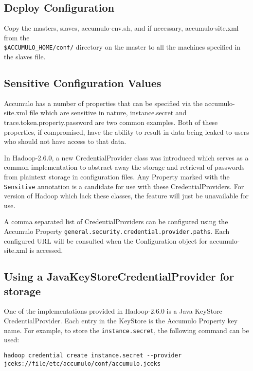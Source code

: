 \subsection{Deploy Configuration}

Copy the masters, slaves, accumulo-env.sh, and if necessary, accumulo-site.xml
from the\\\texttt{\$ACCUMULO\_HOME/conf/} directory on the master to all the machines
specified in the slaves file.

\subsection{Sensitive Configuration Values}

Accumulo has a number of properties that can be specified via the accumulo-site.xml
file which are sensitive in nature, instance.secret and trace.token.property.password
are two common examples. Both of these properties, if compromised, have the ability
to result in data being leaked to users who should not have access to that data.

In Hadoop-2.6.0, a new CredentialProvider class was introduced which serves as a common
implementation to abstract away the storage and retrieval of passwords from plaintext
storage in configuration files. Any Property marked with the \texttt{Sensitive} annotation
is a candidate for use with these CredentialProviders. For version of Hadoop which lack
these classes, the feature will just be unavailable for use.

A comma separated list of CredentialProviders can be configured using the Accumulo Property
\texttt{general.security.credential.provider.paths}. Each configured URL will be consulted
when the Configuration object for accumulo-site.xml is accessed.

\subsection{Using a JavaKeyStoreCredentialProvider for storage}

One of the implementations provided in Hadoop-2.6.0 is a Java KeyStore CredentialProvider.
Each entry in the KeyStore is the Accumulo Property key name. For example, to store the
\texttt{instance.secret}, the following command can be used:

\begingroup\fontsize{8pt}{8pt}\selectfont\begin{verbatim}
hadoop credential create instance.secret --provider jceks://file/etc/accumulo/conf/accumulo.jceks
\end{verbatim}\endgroup

